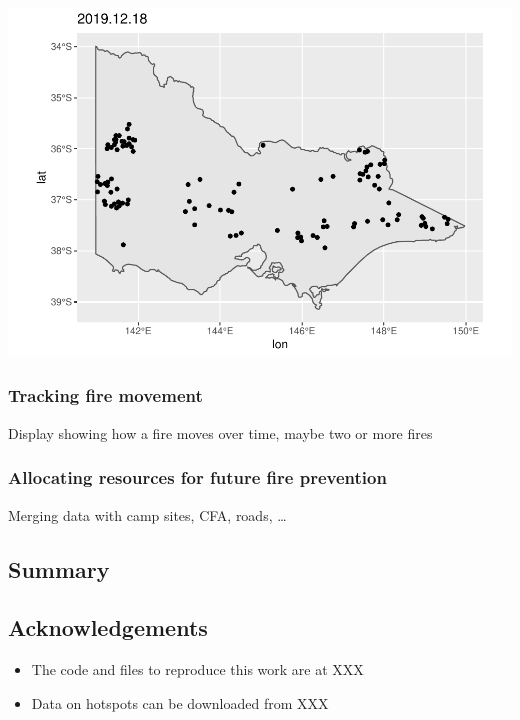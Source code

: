 \begin{Schunk}

\includegraphics[width=0.8\linewidth]{clustering_paper_files/figure-latex/unnamed-chunk-7-1} \end{Schunk}

\hypertarget{tracking-fire-movement}{%
\subsubsection{Tracking fire movement}\label{tracking-fire-movement}}

Display showing how a fire moves over time, maybe two or more fires

\hypertarget{allocating-resources-for-future-fire-prevention}{%
\subsubsection{Allocating resources for future fire
prevention}\label{allocating-resources-for-future-fire-prevention}}

Merging data with camp sites, CFA, roads, \ldots{}

\hypertarget{summary}{%
\subsection{Summary}\label{summary}}

\hypertarget{acknowledgements}{%
\subsection{Acknowledgements}\label{acknowledgements}}

\begin{itemize}
\tightlist
\item
  The code and files to reproduce this work are at XXX
\item
  Data on hotspots can be downloaded from XXX
\end{itemize}

